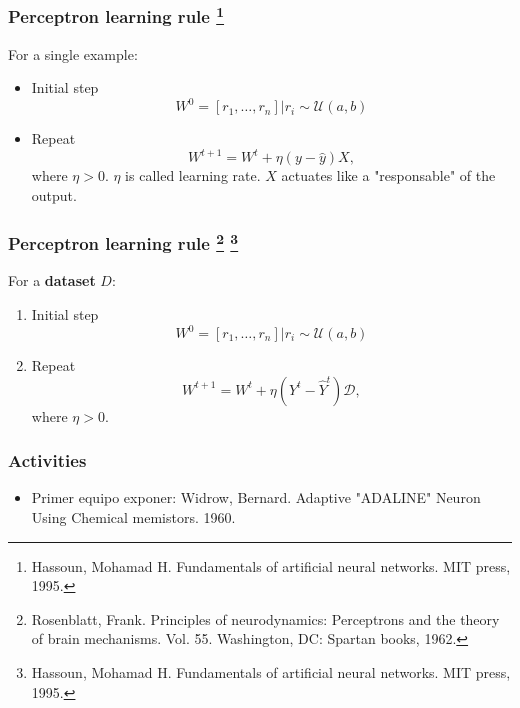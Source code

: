 \documentclass[aspectratio=169]{beamer}
\begin{document}
\begin{frame}
\frametitle{Perceptron learning rule \footnote{Hassoun, Mohamad H. Fundamentals of artificial neural networks. MIT press, 1995.}}
For a single example:
\begin{itemize}
	\item Initial step
	\begin{equation}
		W^0 = [r_1, \dots, r_n] | r_i \sim \mathcal{U}(a,b)
	\end{equation}
	\item Repeat
	\begin{equation}
		W^{t+1} = W^{t} + \eta (y - \hat{y}) X,
	\end{equation} where $\eta > 0$. $\eta$ is called learning rate. $X$ actuates like a "responsable" of the output.
\end{itemize}
\end{frame}



\begin{frame}
	\frametitle{Perceptron learning rule \footnote{Rosenblatt, Frank. Principles of neurodynamics: Perceptrons and the theory of brain mechanisms. Vol. 55. Washington, DC: Spartan books, 1962.} \footnote{Hassoun, Mohamad H. Fundamentals of artificial neural networks. MIT press, 1995.}}
	For a \textbf{dataset} $D$:
	\begin{enumerate}
		\item Initial step
		\begin{equation}
			W^0 = [r_1, \dots, r_n] | r_i \sim \mathcal{U}(a,b)
		\end{equation}
		\item Repeat
		\begin{equation}
			W^{t+1} = W^{t} + \eta (Y^{t} - \hat{Y}^{t}) \mathcal{D},
		\end{equation} where $\eta > 0$. 
	\end{enumerate}
\end{frame}


%
%


\begin{frame}
\frametitle{Activities}
\begin{itemize}
	\item Primer equipo exponer: Widrow, Bernard. Adaptive "ADALINE" Neuron Using Chemical memistors. 1960.
\end{itemize}
\end{frame}
\end{document}
